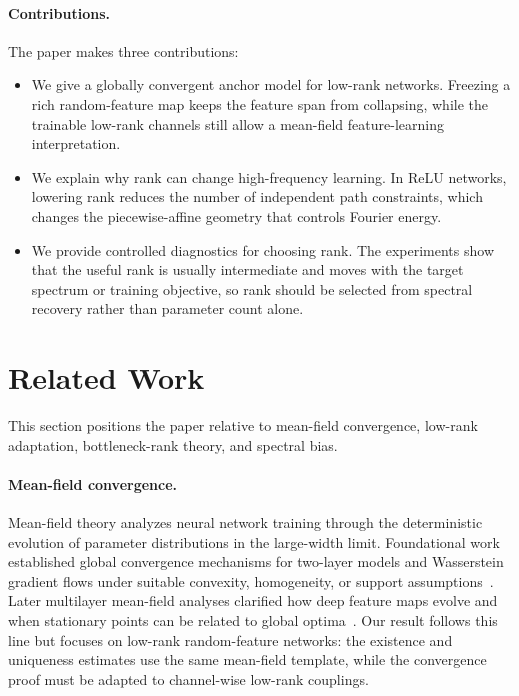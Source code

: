 \documentclass{article}
\begin{document}
\paragraph{Contributions.}
The paper makes three contributions:
\begin{itemize}
\item We give a globally convergent anchor model for low-rank networks. Freezing a rich random-feature map keeps the feature span from collapsing, while the trainable low-rank channels still allow a mean-field feature-learning interpretation.
\item We explain why rank can change high-frequency learning. In ReLU networks, lowering rank reduces the number of independent path constraints, which changes the piecewise-affine geometry that controls Fourier energy.
\item We provide controlled diagnostics for choosing rank. The experiments show that the useful rank is usually intermediate and moves with the target spectrum or training objective, so rank should be selected from spectral recovery rather than parameter count alone.
\end{itemize}

\section{Related Work}
\label{sec:related}

This section positions the paper relative to mean-field convergence, low-rank adaptation, bottleneck-rank theory, and spectral bias.

\paragraph{Mean-field convergence.}
Mean-field theory analyzes neural network training through the deterministic evolution of parameter distributions in the large-width limit. Foundational work established global convergence mechanisms for two-layer models and Wasserstein gradient flows under suitable convexity, homogeneity, or support assumptions~\cite{mei2018,chizat2018}. Later multilayer mean-field analyses clarified how deep feature maps evolve and when stationary points can be related to global optima~\cite{pham2021,nguyen2023}. Our result follows this line but focuses on low-rank random-feature networks: the existence and uniqueness estimates use the same mean-field template, while the convergence proof must be adapted to channel-wise low-rank couplings.
\end{document}
